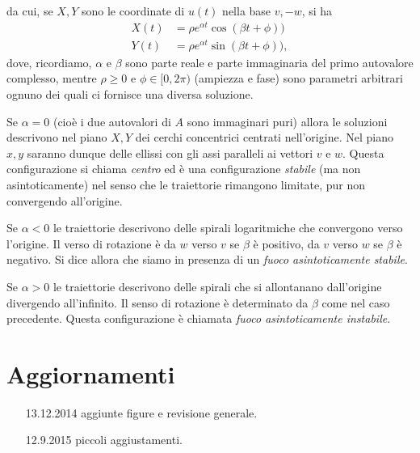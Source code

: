\documentclass[italian,a4paper]{scrartcl}
\begin{document}
da cui, se $X,Y$ sono le coordinate di $u(t)$ nella base $v,-w$, si ha
\begin{align*}
X(t) &= \rho e^{\alpha t} \cos(\beta t+\phi))\\
Y(t) &= \rho e^{\alpha t} \sin(\beta t+\phi)),
\end{align*}
dove, ricordiamo, $\alpha$ e $\beta$ sono parte reale e parte
immaginaria del primo autovalore complesso, mentre $\rho\ge 0$ e $\phi\in[0,2\pi)$
(ampiezza e fase) sono parametri arbitrari ognuno dei quali ci
fornisce una diversa soluzione.

Se $\alpha=0$ 
(cioè i due autovalori di $A$ sono immaginari puri)
allora le soluzioni descrivono nel piano $X,Y$ dei cerchi concentrici
centrati nell'origine. Nel piano $x,y$ saranno dunque delle ellissi
con gli assi paralleli ai vettori $v$ e $w$. Questa configurazione si
chiama \emph{centro} ed è una configurazione \emph{stabile} (ma non
asintoticamente)
nel senso che le traiettorie rimangono limitate, pur non convergendo
all'origine.

Se $\alpha<0$
le traiettorie descrivono delle spirali logaritmiche che convergono
verso l'origine. Il verso di rotazione è da $w$ verso $v$ se $\beta$ è
positivo, da $v$ verso $w$ se $\beta$ è negativo.
Si dice allora che siamo in presenza di un
\emph{fuoco asintoticamente stabile}.

Se $\alpha>0$
le traiettorie descrivono delle spirali che si allontanano
dall'origine divergendo all'infinito. Il senso di rotazione è
determinato da $\beta$ come nel caso precedente.
Questa configurazione è chiamata \emph{fuoco asintoticamente instabile}.

\section*{Aggiornamenti}
\begin{itemize}
\item[13.12.2014] aggiunte figure e revisione generale.
\item[12.9.2015] piccoli aggiustamenti.
\end{itemize}
\end{document}
